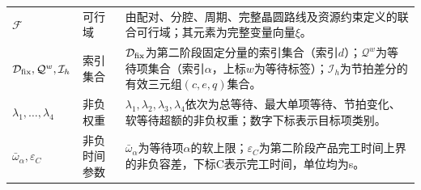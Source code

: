 \documentclass[final,5p,times,twocolumn]{elsarticle}
\begin{document}
\begin{table}[t]
\begin{tabular}{C{0.23\textwidth}C{0.10\textwidth}C{0.61\textwidth}}
$\mathcal F$ & 可行域 & 由配对、分腔、周期、完整晶圆路线及资源约束定义的联合可行域；其元素为完整变量向量$\xi$。\\
$\mathcal D_{\rm fix},\mathcal Q^w,\mathcal I_h$ & 索引集合 & $\mathcal D_{\rm fix}$为第二阶段固定分量的索引集合（索引$d$）；$\mathcal Q^w$为等待项集合（索引$\alpha$，上标$w$为等待标签）；$\mathcal I_h$为节拍差分的有效三元组$(c,e,q)$集合。\\
$\lambda_1,\ldots,\lambda_4$ & 非负权重 & $\lambda_1,\lambda_2,\lambda_3,\lambda_4$依次为总等待、最大单项等待、节拍变化、软等待超额的非负权重；数字下标表示目标项类别。\\
$\bar\omega_\alpha,\varepsilon_C$ & 非负时间参数 & $\bar\omega_\alpha$为等待项$\alpha$的软上限；$\varepsilon_C$为第二阶段产品完工时间上界的非负容差，下标C表示完工时间，单位均为s。\\
\bottomrule
\end{tabular}
\end{table}
\end{document}
